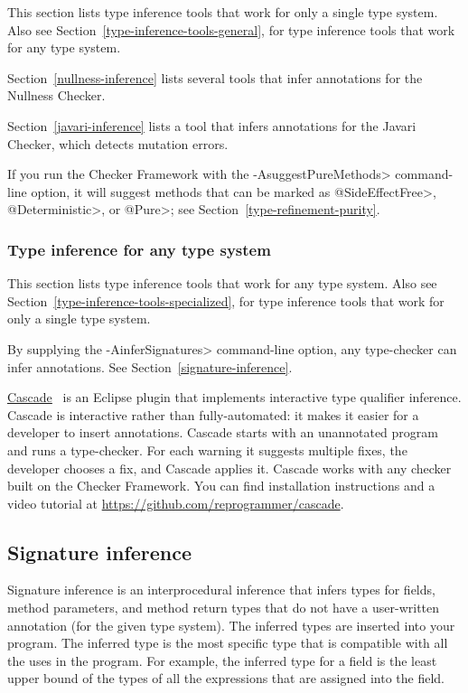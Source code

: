 This section lists type inference tools that work for only a single type system.
Also see Section~\ref{type-inference-tools-general}, for type inference
tools that work for any type system.

Section~\ref{nullness-inference} lists several tools that infer
annotations for the Nullness Checker.

Section~\ref{javari-inference} lists a tool that infers
annotations for the Javari Checker, which detects mutation errors.

If you run the Checker Framework with the \<-AsuggestPureMethods>
command-line option, it will suggest methods that can be marked as
\<@SideEffectFree>, \<@Deterministic>, or \<@Pure>; see
Section~\ref{type-refinement-purity}.


\subsubsection{Type inference for any type system\label{type-inference-tools-general}}

This section lists type inference tools that work for any type system.
Also see Section~\ref{type-inference-tools-specialized}, for type inference
tools that work for only a single type system.

By supplying the \<-AinferSignatures> command-line option,
any type-checker can infer annotations. See Section~\ref{signature-inference}.

\href{https://github.com/reprogrammer/cascade/}{Cascade}~\cite{VakilianPEJ2014}
is an Eclipse plugin that implements interactive type qualifier inference.
Cascade is interactive rather than fully-automated:  it makes it easier for
a developer to insert annotations.
Cascade starts with an unannotated program and runs a type-checker.  For each
warning it suggests multiple fixes, the developer chooses a fix, and
Cascade applies it.  Cascade works with any checker built on the Checker
Framework.
You can find installation instructions and a video tutorial at \url{https://github.com/reprogrammer/cascade}.


\subsection{Signature inference\label{signature-inference}}

Signature inference is an interprocedural inference that
infers types for fields, method parameters, and method return types that do not
have a user-written annotation (for the given type system).
The inferred types are inserted into
your program.
The inferred type is the most specific type that is compatible with all the
uses in the program.  For example, the inferred type for a field is the
least upper bound of the types of all the expressions that are assigned
into the field.

